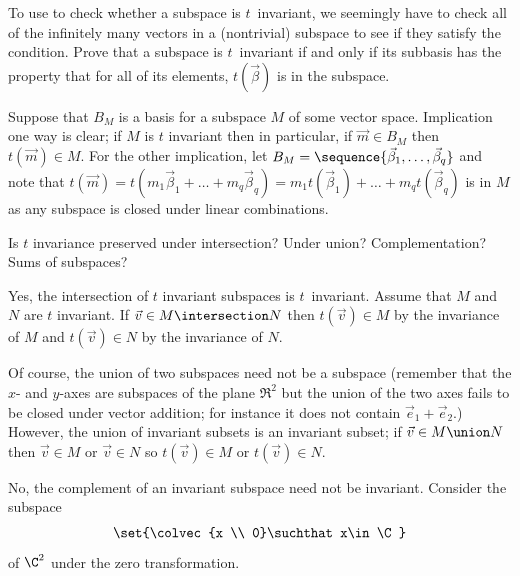 \begin{exercises}
  \item 
    To use  to check whether a subspace
    is $t$~invariant, we seemingly have to check all of the infinitely many
    vectors in a (nontrivial) subspace to see if they satisfy the condition.
    Prove that a subspace is \( t \)~invariant if and only if its subbasis
    has the property that for all of its elements, $t(\vec{\beta})$ is in 
    the subspace.
    \begin{answer}
      Suppose that \( B_M \) is a basis for a subspace \( M \) of some vector
      space.
      Implication one way is clear; if \( M \) is \( t \) invariant then
      in particular, if \( \vec{m}\in B_M \) then \( t(\vec{m})\in M \).
      For the other implication, let
      \( B_M=\sequence{\vec{\beta}_1,\dots,\vec{\beta}_q} \) and note that
      \( t(\vec{m})=t(m_1\vec{\beta}_1+\dots+m_q\vec{\beta}_q)
                   =m_1t(\vec{\beta}_1)+\dots+m_qt(\vec{\beta}_q) \)
      is in \( M \) as any subspace is closed under linear
      combinations. 
    \end{answer}
  \recommended \item 
    Is \( t \) invariance preserved under intersection?
    Under union?
    Complementation?
    Sums of subspaces?
    \begin{answer}
      Yes, the intersection 
      of $t$ invariant subspaces is $t$~invariant.
      Assume that \( M \) and \( N \) are \( t \) invariant.
      If \( \vec{v}\in M\intersection N \) then \( t(\vec{v})\in M \)
      by the invariance of \( M \) and \( t(\vec{v})\in N \) by the
      invariance of \( N \).

      Of course, the union of two subspaces need not be a subspace
      (remember that the $x$-\hbox{} and $y$-axes are subspaces of the plane
      $\Re^2$ but the union of the two axes fails to be closed
      under vector addition; for instance it does not contain
      $\vec{e}_1+\vec{e}_2$.)
      However, the union of invariant subsets is an invariant subset; if
      \( \vec{v}\in M\union N \) then \( \vec{v}\in M \) or \( \vec{v}\in N \)
      so \( t(\vec{v})\in M \) or \( t(\vec{v})\in N \).

      No, the complement of an invariant subspace need not be invariant.
      Consider the subspace
      \begin{equation*}
        \set{\colvec{x \\ 0}\suchthat x\in\C}
      \end{equation*}
      of \( \C^2 \) under the zero transformation.


\end{answer}
\end{exercises}
